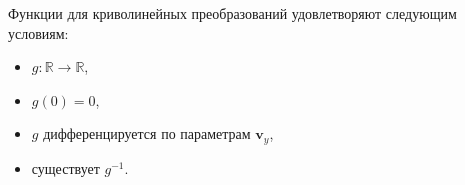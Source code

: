 \documentclass[12pt,twoside]{article}
\newcommand{\bY}{\mathbf{Y}}
\newcommand{\bv}{\mathbf{v}}
\begin{document}
 
Функции для криволинейных преобразований удовлетворяют следующим условиям:
\begin{itemize}
    \item $g: \mathbb{R} \to \mathbb{R}$,
    \item $g(0) = 0$,
    \item $g$ дифференцируется по параметрам $\bv_y$,
    \item существует $g^{-1}$.
\end{itemize}
\end{document}
